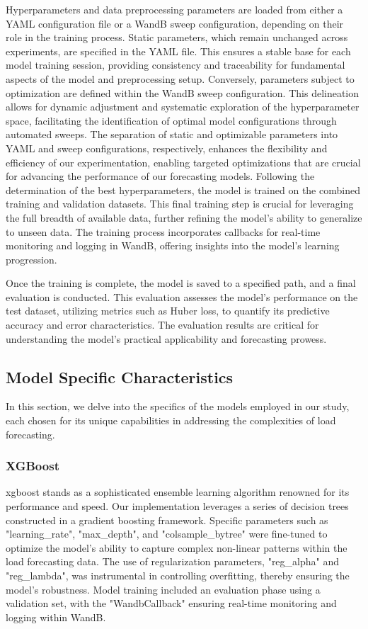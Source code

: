 \documentclass{article} %
\begin{document}
Hyperparameters and data preprocessing parameters are loaded from either a YAML configuration file or a \gls{WandB} sweep configuration, depending on their role in the training process. Static parameters, which remain unchanged across experiments, are specified in the YAML file. This ensures a stable base for each model training session, providing consistency and traceability for fundamental aspects of the model and preprocessing setup. Conversely, parameters subject to optimization are defined within the \gls{WandB} sweep configuration. This delineation allows for dynamic adjustment and systematic exploration of the hyperparameter space, facilitating the identification of optimal model configurations through automated sweeps. The separation of static and optimizable parameters into YAML and sweep configurations, respectively, enhances the flexibility and efficiency of our experimentation, enabling targeted optimizations that are crucial for advancing the performance of our forecasting models. 
Following the determination of the best hyperparameters, the model is trained on the combined training and validation datasets. This final training step is crucial for leveraging the full breadth of available data, further refining the model's ability to generalize to unseen data. The training process incorporates callbacks for real-time monitoring and logging in \gls{WandB}, offering insights into the model's learning progression. 

Once the training is complete, the model is saved to a specified path, and a final evaluation is conducted. This evaluation assesses the model's performance on the test dataset, utilizing metrics such as Huber loss, to quantify its predictive accuracy and error characteristics. The evaluation results are critical for understanding the model's practical applicability and forecasting prowess. 

\subsection{Model Specific Characteristics}

In this section, we delve into the specifics of the models employed in our study, each chosen for its unique capabilities in addressing the complexities of load forecasting. 


\subsubsection{XGBoost}
\Gls{xgboost} stands as a sophisticated ensemble learning algorithm renowned for its performance and speed. Our implementation leverages a series of decision trees constructed in a gradient boosting framework. Specific parameters such as "learning\_rate", "max\_depth", and "colsample\_bytree" were fine-tuned to optimize the model's ability to capture complex non-linear patterns within the load forecasting data. The use of regularization parameters, "reg\_alpha" and "reg\_lambda", was instrumental in controlling overfitting, thereby ensuring the model's robustness. Model training included an evaluation phase using a validation set, with the "WandbCallback" ensuring real-time monitoring and logging within \gls{WandB}. 
\end{document}
